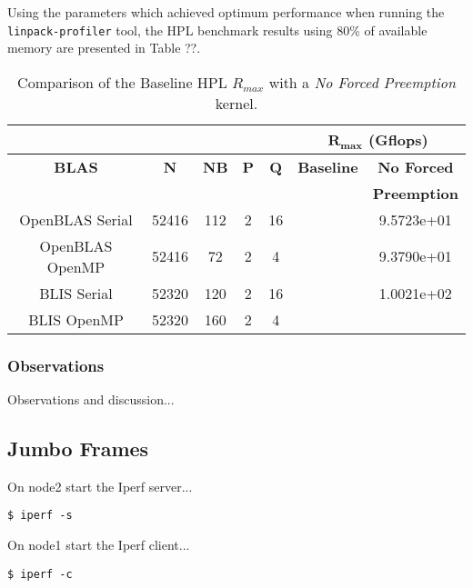 Using the parameters which achieved optimum performance when running the \texttt{linpack-profiler} tool, the HPL benchmark results using 80\% of available memory are presented in Table ??. 

\begin{table}[H]
\begin{center}
\begin{tabular}{ |c|c|c|c|c|c|c| } 
\hline
\multicolumn{5}{|c}{} & \multicolumn{2}{|c|}{$\mathbf{R_{max}}$ \textbf{(Gflops)}} \\
\hline
\textbf{BLAS} & \textbf{N} & \textbf{NB} & \textbf{P} & \textbf{Q} & \textbf{Baseline}  & \textbf{No Forced}  \\
              &            &             &            &            &                    & \textbf{Preemption} \\
\hline
OpenBLAS Serial & 52416 & 112 & 2 & 16 &  & 9.5723e+01 \\
\hline
OpenBLAS OpenMP & 52416 &  72 & 2 &  4 &  & 9.3790e+01 \\
\hline
BLIS Serial     & 52320 & 120 & 2 & 16 &  & 1.0021e+02 \\
\hline
BLIS OpenMP     & 52320 & 160 & 2 &  4 &  &  \\
\hline
\end{tabular}
\end{center}
\caption{\label{tab:table-name}Comparison of the Baseline HPL $R_{max}$ with a \emph{No Forced Preemption} kernel.}
\end{table}


\subsubsection{Observations}

Observations and discussion...


%
%
\subsection{Jumbo Frames}

On node2 start the Iperf server...

\lstset{style=type}
\begin{lstlisting}
$ iperf -s
\end{lstlisting}

On node1 start the Iperf client...

\lstset{style=type}
\begin{lstlisting}
$ iperf -c
\end{lstlisting}

